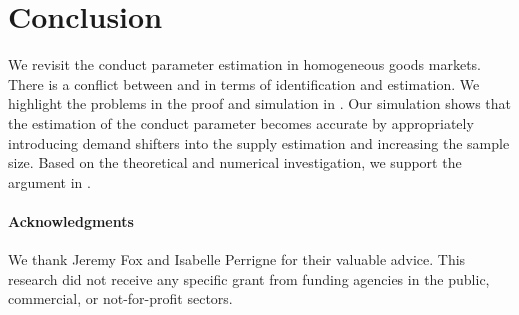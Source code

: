 \documentclass[11pt, a4paper]{article}
\begin{document}
\section{Conclusion}
We revisit the conduct parameter estimation in homogeneous goods markets.
There is a conflict between \citet{bresnahan1982oligopoly} and \citet{perloff2012collinearity} in terms of identification and estimation.
We highlight the problems in the proof and simulation in \citet{perloff2012collinearity}.
Our simulation shows that the estimation of the conduct parameter becomes accurate by appropriately introducing demand shifters into the supply estimation and increasing the sample size. 
Based on the theoretical and numerical investigation, we support the argument in \citet{bresnahan1982oligopoly}.


\paragraph{Acknowledgments}
We thank Jeremy Fox and Isabelle Perrigne for their valuable advice. This research did not receive any specific grant from funding agencies in the public, commercial, or not-for-profit sectors. 

\newpage




\newpage
\appendix


\end{document}

